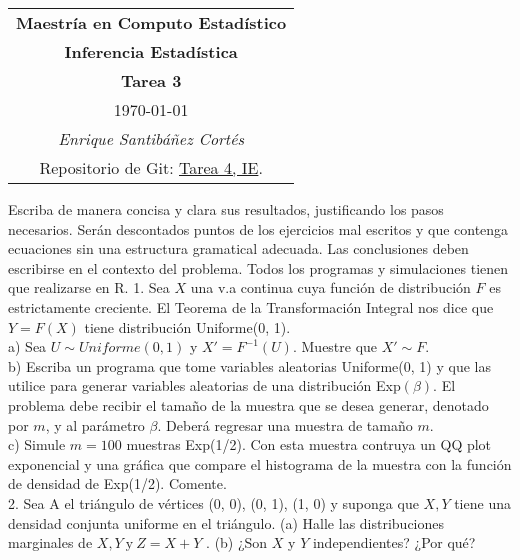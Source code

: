 \documentclass[11pt,letterpaper]{article}
\begin{document}
\begin{table}[ht]
\centering
\begin{tabular}{c}
\textbf{Maestría en Computo Estadístico}\\
\textbf{Inferencia Estadística} \\
\textbf{Tarea 3}\\
\today \\
\emph{Enrique Santibáñez Cortés}\\
Repositorio de Git: \href{https://github.com/Enriquesec/Inferencia_Estad-stica/tree/master/Tareas/Tarea_4}{Tarea 4, IE}.
\end{tabular}
\end{table}
Escriba de manera concisa y clara sus resultados, justificando los pasos necesarios. Serán descontados puntos de los ejercicios mal escritos y que contenga ecuaciones sin una estructura gramatical adecuada. Las conclusiones deben escribirse en el contexto del problema. Todos los programas y
simulaciones tienen que realizarse en R.
1. Sea $X$ una v.a continua cuya función de distribución $F$ es estrictamente creciente. El Teorema
de la Transformación Integral nos dice que $Y=F(X)$ tiene distribución Uniforme(0, 1).\\

a) Sea $U\sim Uniforme(0, 1)$ y $X'=F ^{-1}(U)$. Muestre que $X' \sim F$.\\

b) Escriba un programa que tome variables aleatorias Uniforme(0, 1) y que las utilice para generar variables aleatorias de una distribución Exp$(\beta)$. El problema debe recibir el
tamaño de la muestra que se desea generar, denotado por $m$, y al parámetro $\beta$. Deberá regresar una muestra de tamaño $m$.\\

c) Simule $m=100$ muestras Exp(1/2). Con esta muestra contruya un QQ plot exponencial y una gráfica que compare el histograma de la muestra con la función de densidad de
Exp(1/2). Comente.\\

2. Sea A el triángulo de vértices (0, 0), (0, 1), (1, 0) y suponga que $X, Y$ tiene una densidad conjunta uniforme en el triángulo. (a) Halle las distribuciones marginales de $X, Y \ \text{y}\ Z =X + Y$ . (b) ¿Son $X$ y $Y$ independientes? ¿Por qué?\\
\end{document}

